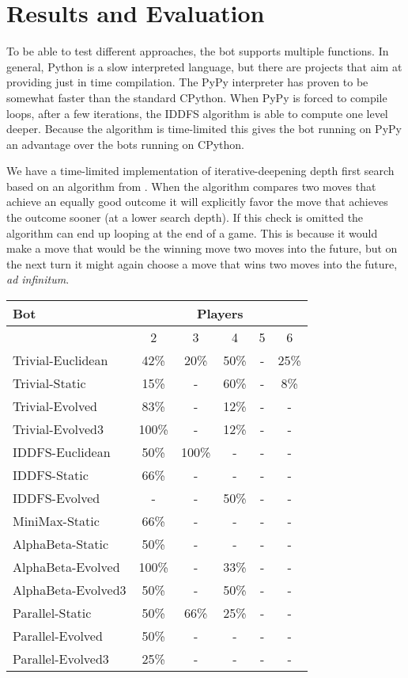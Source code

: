 \section{Results and Evaluation}

To be able to test different approaches, the bot supports multiple
functions. In general, Python is a slow interpreted language, but
there are projects that aim at providing just in time compilation. The
PyPy interpreter has proven to be somewhat faster than the standard
CPython. When PyPy is forced to compile loops, after a few iterations,
the IDDFS algorithm is able to compute one level deeper. Because the
algorithm is time-limited this gives the bot running on PyPy an
advantage over the bots running on CPython.

We have a time-limited implementation of iterative-deepening depth
first search based on an algorithm from \cite{aimodern}. When the
algorithm compares two moves that achieve an equally good outcome it
will explicitly favor the move that achieves the outcome sooner (at a
lower search depth). If this check is omitted the algorithm can end up
looping at the end of a game. This is because it would make a move
that would be the winning move two moves into the future, but on the
next turn it might again choose a move that wins two moves into the
future, \emph{ad infinitum}.

\begin{tabular}{ | l | c | c | c | c | c | }
\hline
Bot & \multicolumn{5}{|c|}{Players} \\
\hline
& 2 & 3 & 4 & 5 & 6 \\
\hline
Trivial-Euclidean & 42\% & 20\% & 50\% & - & 25\% \\
\hline
Trivial-Static & 15\% & - & 60\% & - & 8\% \\
\hline
Trivial-Evolved & 83\% & - & 12\% & - & - \\
\hline
Trivial-Evolved3 & 100\% & - & 12\% & - & - \\
\hline
IDDFS-Euclidean & 50\% & 100\% & - & - & - \\
\hline
IDDFS-Static & 66\% & - & - & - & - \\
\hline
IDDFS-Evolved & - & - & 50\% & - & - \\
\hline
MiniMax-Static & 66\% & - & - & - & - \\
\hline
AlphaBeta-Static & 50\% & - & - & - & - \\
\hline
AlphaBeta-Evolved & 100\% & - & 33\% & - & - \\
\hline
AlphaBeta-Evolved3 & 50\% & - & 50\% & - & - \\
\hline
Parallel-Static & 50\% & 66\% & 25\% & - & - \\
\hline
Parallel-Evolved & 50\% & - & - & - & - \\
\hline
Parallel-Evolved3 & 25\% & - & - & - & - \\
\hline
\end{tabular}
